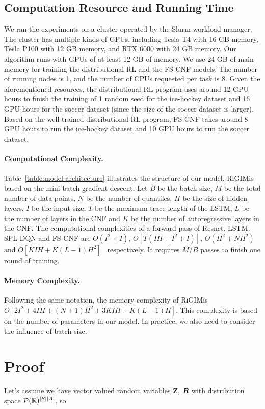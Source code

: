 \documentclass{article}
\newcommand{\state}{s}
\newcommand{\action}{a}
\newcommand{\reward}{r}
\newcommand{\sys}{RiGIM}
\newcommand{\system}{\sys\;}
\begin{document}
\subsection{Computation Resource and Running Time}
We ran the experiments on a cluster operated by the Slurm workload manager. The cluster has multiple kinds of GPUs, including Tesla T4 with 16 GB memory, Tesla P100 with 12 GB memory, and RTX 6000 with 24 GB memory. 
Our algorithm runs with GPUs of at least 12 GB of memory. We use 24 GB of main memory for training the distributional RL and the FS-CNF models. The number of running nodes is 1, and the number of CPUs requested per task is 8. Given the aforementioned resources, the distributional RL program uses around 12 GPU hours to finish the training of 1 random seed for the ice-hockey dataset and 16 GPU hours for the soccer dataset (since the size of the soccer dataset is larger). 
Based on the well-trained distributional RL program, FS-CNF takes around 8 GPU hours 
to run the ice-hockey dataset and 10 GPU hours to run the soccer dataset. 

\paragraph{Computational Complexity.} Table~\ref{table:model-architecture} illustrates the structure of our model. \system is based on the mini-batch gradient descent. Let $B$ be the batch size, $M$ be the total number of data points, $N$ be the number of quantiles, $H$ be the size of hidden layers, $I$ be the input size, $T$ be the maximum trace length of the LSTM, $L$ be the number of layers in the CNF and $K$ be the number of autoregressive layers in the CNF.
The computational complexities of a forward pass of Resnet, LSTM, SPL-DQN and FS-CNF are $O(I^2+I)$, $O[T(IH+ I^2+I)]$, $O(H^2+NH^2)$~\cite{luo2022distributional} and $O[KIH+K(L-1)H^2]$~\cite{Papamakarios2017MAF} respectively. It requires $M/B$ passes to finish one round of training.
\paragraph{Memory Complexity.} Following the same notation, the memory complexity of \system is $O[2I^{2}+4IH+(N+1)H^2+3KIH+K(L-1)H]$. This complexity is based on the number of parameters in our model. In practice, we also need to consider the influence of batch size.

\section{Proof}
Let's assume we have vector valued random variables $\boldsymbol{Z}$, $\boldsymbol{\MakeUppercase{\reward}}$ with distribution space $ \mathcal{P}(\mathbb{R})^{|\MakeUppercase{\state}||\MakeUppercase{\action}|}$, so
\end{document}
